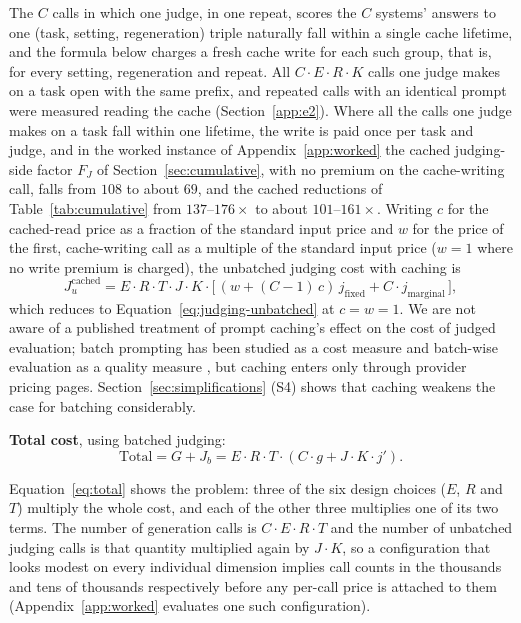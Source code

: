 \documentclass[11pt]{article}
\begin{document}
The $C$ calls in which one judge, in one repeat, scores the $C$ systems' answers to one (task, setting, regeneration) triple naturally fall within a single cache lifetime, and the formula below charges a fresh cache write for each such group, that is, for every setting, regeneration and repeat. All $C \cdot E \cdot R \cdot K$ calls one judge makes on a task open with the same prefix, and repeated calls with an identical prompt were measured reading the cache (Section~\ref{app:e2}). Where all the calls one judge makes on a task fall within one lifetime, the write is paid once per task and judge, and in the worked instance of Appendix~\ref{app:worked} the cached judging-side factor $F_J$ of Section~\ref{sec:cumulative}, with no premium on the cache-writing call, falls from $108$ to about $69$, and the cached reductions of Table~\ref{tab:cumulative} from $137$--$176\times$ to about $101$--$161\times$. Writing $c$
for the cached-read price as a fraction of the standard input price and $w$ for the
price of the first, cache-writing call as a multiple of the standard input price ($w = 1$ where no write premium is charged), the unbatched judging cost with caching is
\begin{equation}
J_u^{\text{cached}} = E \cdot R \cdot T \cdot J \cdot K \cdot \big[\,(w + (C-1)\,c)\,
j_{\text{fixed}} + C \cdot j_{\text{marginal}}\,\big],
\label{eq:judging-cached}
\end{equation}
which reduces to Equation~\ref{eq:judging-unbatched} at $c = w = 1$. We are not aware of a
published treatment of prompt caching's effect on the cost of judged evaluation; batch
prompting has been studied as a cost measure \citep{cheng2023batch} and batch-wise
evaluation as a quality measure \citep{yuan2024batcheval}, but caching enters only
through provider pricing pages.
Section~\ref{sec:simplifications} (S4) shows that caching weakens the case for batching considerably.

\textbf{Total cost}, using batched judging:
\begin{equation}
\text{Total} = G + J_b = E \cdot R \cdot T \cdot \left( C \cdot g + J \cdot K \cdot j'
\right).
\label{eq:total}
\end{equation}

Equation~\ref{eq:total} shows the problem: three of the six design choices ($E$, $R$ and $T$) multiply the whole cost, and each of the other three multiplies one of its two terms. The number of generation
calls is $C \cdot E \cdot R \cdot T$ and the number of unbatched judging calls is that
quantity multiplied again by $J \cdot K$, so a configuration that looks modest on every
individual dimension implies call counts in the thousands and tens of thousands
respectively before any per-call price is attached to them
(Appendix~\ref{app:worked} evaluates one such configuration).
\end{document}
